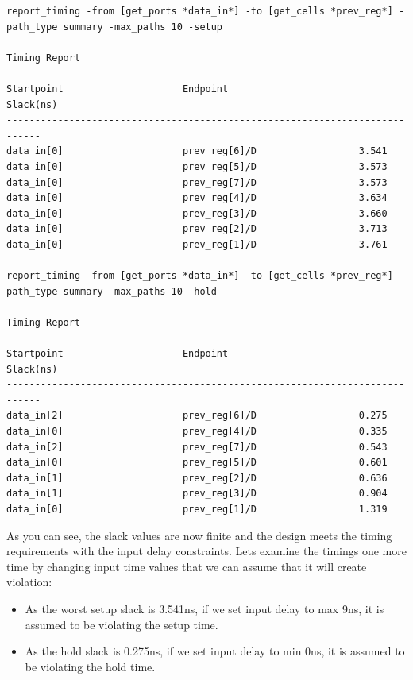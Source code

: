 \documentclass{report}
\begin{document}
\begin{verbatim}
report_timing -from [get_ports *data_in*] -to [get_cells *prev_reg*] -path_type summary -max_paths 10 -setup

Timing Report

Startpoint                     Endpoint                       Slack(ns)     
----------------------------------------------------------------------------
data_in[0]                     prev_reg[6]/D                  3.541         
data_in[0]                     prev_reg[5]/D                  3.573         
data_in[0]                     prev_reg[7]/D                  3.573         
data_in[0]                     prev_reg[4]/D                  3.634         
data_in[0]                     prev_reg[3]/D                  3.660         
data_in[0]                     prev_reg[2]/D                  3.713         
data_in[0]                     prev_reg[1]/D                  3.761 

report_timing -from [get_ports *data_in*] -to [get_cells *prev_reg*] -path_type summary -max_paths 10 -hold

Timing Report

Startpoint                     Endpoint                       Slack(ns)     
----------------------------------------------------------------------------
data_in[2]                     prev_reg[6]/D                  0.275         
data_in[0]                     prev_reg[4]/D                  0.335         
data_in[2]                     prev_reg[7]/D                  0.543         
data_in[0]                     prev_reg[5]/D                  0.601         
data_in[1]                     prev_reg[2]/D                  0.636         
data_in[1]                     prev_reg[3]/D                  0.904         
data_in[0]                     prev_reg[1]/D                  1.319    
\end{verbatim}
As you can see, the slack values are now finite and the design meets the timing requirements with the input delay constraints. Lets examine the timings one more time by changing input time values that we can assume that it will create violation:
\begin{itemize}
    \item As the worst setup slack is 3.541ns, if we set input delay to max 9ns, it is assumed to be violating the setup time.
    \item As the hold slack is 0.275ns, if we set input delay to min 0ns, it is assumed to be violating the hold time.
\end{itemize}
\end{document}

